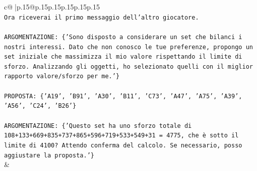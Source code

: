 \documentclass{article}
\begin{document}
{\begin{supertabular}{c@{$\;$}|p{.15\linewidth}@{}p{.15\linewidth}p{.15\linewidth}p{.15\linewidth}p{.15\linewidth}p{.15\linewidth}}
{{{\\ 
\texttt{Ora riceverai il primo messaggio dell'altro giocatore.} \\
\\ 
\texttt{ARGOMENTAZIONE: \{'Sono disposto a considerare un set che bilanci i nostri interessi. Dato che non conosco le tue preferenze, propongo un set iniziale che massimizza il mio valore rispettando il limite di sforzo. Analizzando gli oggetti, ho selezionato quelli con il miglior rapporto valore/sforzo per me.'\}} \\
\\ 
\texttt{PROPOSTA: \{'A19', 'B91', 'A30', 'B11', 'C73', 'A47', 'A75', 'A39', 'A56', 'C24', 'B26'\}} \\
\\ 
\texttt{ARGOMENTAZIONE: \{'Questo set ha uno sforzo totale di 108+133+669+835+737+865+596+719+533+549+31 = 4775, che è sotto il limite di 4100? Attendo conferma del calcolo. Se necessario, posso aggiustare la proposta.'\}} \\
            }
        }
    }
    & \\ \\


\end{supertabular}}
\end{document}
